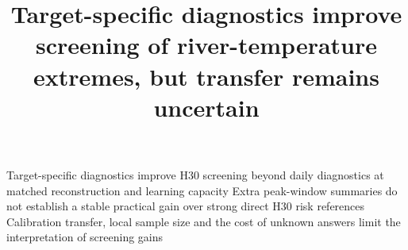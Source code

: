 \documentclass[draft]{agujournal2025}
\begin{document}
\title{Target-specific diagnostics improve screening of river-temperature extremes, but transfer remains uncertain}
\keypoints
  {Target-specific diagnostics improve H30 screening beyond daily diagnostics at matched reconstruction and learning capacity}
  {Extra peak-window summaries do not establish a stable practical gain over strong direct H30 risk references}
  {Calibration transfer, local sample size and the cost of unknown answers limit the interpretation of screening gains}
\maketitle\par
\end{document}
